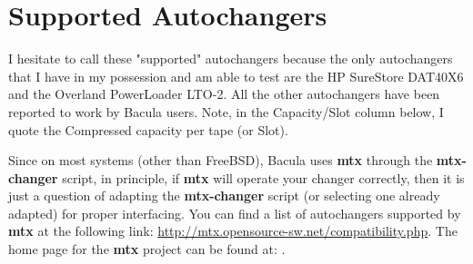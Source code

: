 
\chapter{Supported Autochangers}
\label{Models}

I hesitate to call these "supported" autochangers because the only
autochangers that I have in my possession and am able to test are the HP
SureStore DAT40X6 and the Overland PowerLoader LTO-2.  All the other
autochangers have been reported to work by Bacula users.  Note, in the
Capacity/Slot column below, I quote the Compressed capacity per tape (or
Slot).

Since on most systems (other than FreeBSD), Bacula uses {\bf mtx}
through the {\bf mtx-changer} script, in principle, if {\bf mtx}
will operate your changer correctly, then it is just a question
of adapting the {\bf mtx-changer} script (or selecting one
already adapted) for proper interfacing.  You can find a list of
autochangers supported by {\bf mtx} at the following link:
{\url{http://mtx.opensource-sw.net/compatibility.php}}.
The home page for the {\bf mtx} project can be found at:
.


